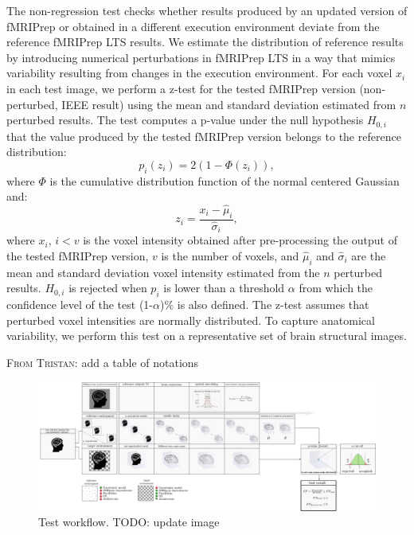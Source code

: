 \documentclass{article}
\newcommand{\TODO}[1]{\color{red}\textsc{TODO:} #1\color{black}\xspace}
\newcommand{\TG}[1]{\color{blue}\textsc{From Tristan:} #1\color{black}\xspace}
\begin{document}
The non-regression test checks whether results produced by an updated version of
fMRIPrep or obtained in a different execution environment deviate from the
reference fMRIPrep LTS results. We estimate the distribution of reference
results by introducing numerical perturbations in fMRIPrep LTS in a way that
mimics variability resulting from changes in the execution environment.  For
each voxel $x_i$ in each test image, we perform a z-test for the tested fMRIPrep
version (non-perturbed, IEEE result) using the mean and standard deviation
estimated from $n$ perturbed results. The test computes a p-value under the null
hypothesis $H_{0,i}$ that the value produced by the tested fMRIPrep version
belongs to the reference distribution:
\begin{equation}
    \label{eqn:pval}
    p_i(z_i) = 2 \left(1-\Phi(z_i)\right),
\end{equation}
where $\Phi$ is the cumulative distribution function of the normal centered
Gaussian and:
\begin{equation*}
    z_i = \frac{x_i-\hat \mu_i}{\hat \sigma_i},
\end{equation*}
where $x_i$, $i < v$ is the voxel intensity obtained after pre-processing the
output of the tested fMRIPrep version, $v$ is the number of voxels, and $\hat
    \mu_i$ and $\hat \sigma_i$ are the mean and standard deviation voxel intensity
estimated from the $n$ perturbed results. $H_{0,i}$ is rejected when $p_i$ is
lower than a threshold $\alpha$ from which the confidence level of the test
(1-$\alpha$)\% is also defined. The z-test assumes that perturbed voxel
intensities are normally distributed. To capture anatomical variability, we
perform this test on a representative set of brain structural images.

\TG{add a table of notations}

\begin{figure}
    \centering
    \includegraphics[width=\linewidth]{figures/stat_test_procedure.pdf}
    \caption{Test workflow. \TODO{update image}}
    \label{fig:test_workflow}
\end{figure}
\end{document}
